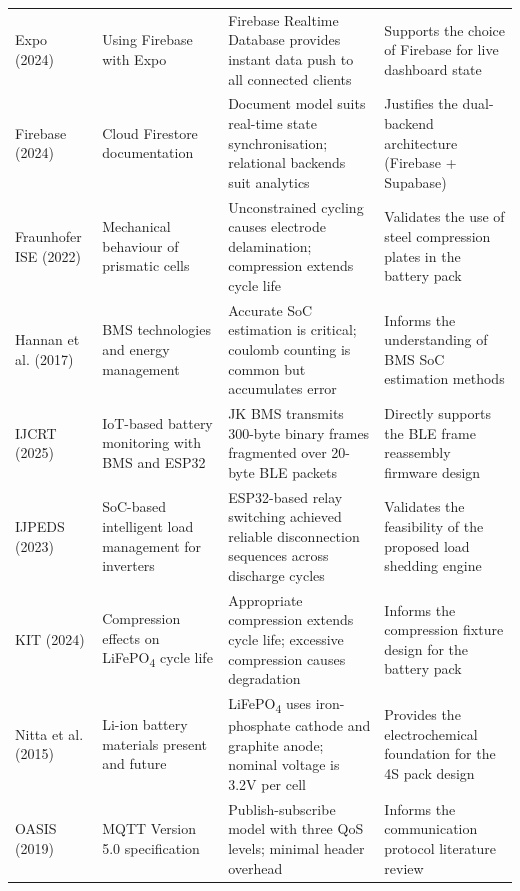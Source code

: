 \documentclass[12pt, a4paper]{report}
\begin{document}
\begin{longtable}{L{2.8cm} L{3.5cm} L{4.5cm} L{3.5cm}}
Expo (2024) & Using Firebase with Expo & Firebase Realtime Database provides instant data push to all connected clients & Supports the choice of Firebase for live dashboard state \\

Firebase (2024) & Cloud Firestore documentation & Document model suits real-time state synchronisation; relational backends suit analytics & Justifies the dual-backend architecture (Firebase + Supabase) \\

Fraunhofer ISE (2022) & Mechanical behaviour of prismatic cells & Unconstrained cycling causes electrode delamination; compression extends cycle life & Validates the use of steel compression plates in the battery pack \\

Hannan et al. (2017) & BMS technologies and energy management & Accurate SoC estimation is critical; coulomb counting is common but accumulates error & Informs the understanding of BMS SoC estimation methods \\

IJCRT (2025) & IoT-based battery monitoring with BMS and ESP32 & JK BMS transmits 300-byte binary frames fragmented over 20-byte BLE packets & Directly supports the BLE frame reassembly firmware design \\

IJPEDS (2023) & SoC-based intelligent load management for inverters & ESP32-based relay switching achieved reliable disconnection sequences across discharge cycles & Validates the feasibility of the proposed load shedding engine \\

KIT (2024) & Compression effects on LiFePO\textsubscript{4} cycle life & Appropriate compression extends cycle life; excessive compression causes degradation & Informs the compression fixture design for the battery pack \\

Nitta et al. (2015) & Li-ion battery materials present and future & LiFePO\textsubscript{4} uses iron-phosphate cathode and graphite anode; nominal voltage is 3.2V per cell & Provides the electrochemical foundation for the 4S pack design \\

OASIS (2019) & MQTT Version 5.0 specification & Publish-subscribe model with three QoS levels; minimal header overhead & Informs the communication protocol literature review \\


\end{longtable}
\end{document}
